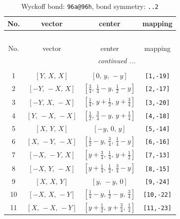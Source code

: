 \documentclass[fleqn,8pt]{jsarticle}
\begin{document}
\begin{longtable}{cccc}
\caption{Wyckoff bond: {\tt 96a@96h}, bond symmetry: {\tt ..2}}
 \\
 \hline \hline
No. & vector & center & mapping \\ \hline \endfirsthead

\multicolumn{3}{l}{\tablename\ \thetable{}} \\
 \hline \hline
No. & vector & center & mapping \\ \hline \endhead

 \hline \hline
\multicolumn{3}{r}{\footnotesize\it continued ...} \\ \endfoot

 \hline \hline
\multicolumn{3}{r}{} \\ \endlastfoot

1 & $\left[ Y,\, X,\, X \right]$ & $\left[ 0,\, y,\, - y \right]$ & {\tt [1,-19]} \\ \hline
2 & $\left[ - Y,\, - X,\, X \right]$ & $\left[ \frac{3}{4},\, \frac{1}{4} - y,\, \frac{1}{2} - y \right]$ & {\tt [2,-17]} \\ \hline
3 & $\left[ - Y,\, X,\, - X \right]$ & $\left[ \frac{1}{4},\, y + \frac{1}{2},\, y + \frac{3}{4} \right]$ & {\tt [3,-20]} \\ \hline
4 & $\left[ Y,\, - X,\, - X \right]$ & $\left[ \frac{1}{2},\, \frac{3}{4} - y,\, y + \frac{1}{4} \right]$ & {\tt [4,-18]} \\ \hline
5 & $\left[ X,\, Y,\, X \right]$ & $\left[ - y,\, 0,\, y \right]$ & {\tt [5,-14]} \\ \hline
6 & $\left[ X,\, - Y,\, - X \right]$ & $\left[ \frac{1}{2} - y,\, \frac{3}{4},\, \frac{1}{4} - y \right]$ & {\tt [6,-16]} \\ \hline
7 & $\left[ - X,\, - Y,\, X \right]$ & $\left[ y + \frac{3}{4},\, \frac{1}{4},\, y + \frac{1}{2} \right]$ & {\tt [7,-13]} \\ \hline
8 & $\left[ - X,\, Y,\, - X \right]$ & $\left[ y + \frac{1}{4},\, \frac{1}{2},\, \frac{3}{4} - y \right]$ & {\tt [8,-15]} \\ \hline
9 & $\left[ X,\, X,\, Y \right]$ & $\left[ y,\, - y,\, 0 \right]$ & {\tt [9,-24]} \\ \hline
10 & $\left[ - X,\, X,\, - Y \right]$ & $\left[ \frac{1}{4} - y,\, \frac{1}{2} - y,\, \frac{3}{4} \right]$ & {\tt [10,-22]} \\ \hline
11 & $\left[ X,\, - X,\, - Y \right]$ & $\left[ y + \frac{1}{2},\, y + \frac{3}{4},\, \frac{1}{4} \right]$ & {\tt [11,-23]} \\ \hline

\end{longtable}
\end{document}
